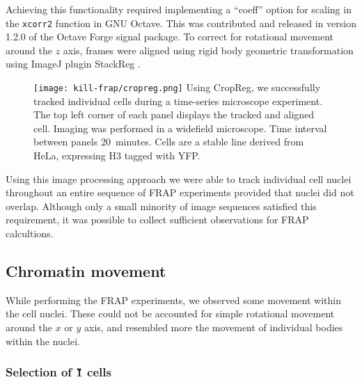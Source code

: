       Achieving this functionality required implementing a ``coeff'' option 
	  for scaling in the \texttt{xcorr2} function in GNU Octave.
	  This was contributed and released in version 1.2.0 of the Octave Forge signal package.
      To correct for rotational movement around the $z$ axis, 
      frames were aligned using rigid body geometric transformation using ImageJ plugin StackReg \citep{stackreg}.

      \begin{figure}
        \centering
        \texttt{[image: kill-frap/cropreg.png]}
          {
            Using CropReg, we successfully tracked individual cells during
            a time-series microscope experiment. The top left corner of each
            panel displays the tracked and aligned cell. Imaging was performed
            in a widefield microscope. Time interval between panels 20~minutes.
            Cells are a stable line derived from HeLa, expressing H3 tagged
            with YFP.
          }
        \label{fig:kill-frap:cropreg}
      \end{figure}

      Using this image processing approach we were able to track individual cell nuclei 
	  throughout an entire sequence of FRAP experiments  provided
      that nuclei did not overlap. 
	  Although only a small minority of image sequences satisfied this requirement, 
	  it was possible to collect sufficient observations for FRAP calcultions.

  \subsection{Chromatin movement}

    While performing the FRAP experiments, we observed some movement
    within the cell nuclei. These could not be accounted for simple rotational
    movement around the $x$ or $y$ axis, and resembled more the movement
    of individual bodies within the nuclei.

    \subsubsection{Selection of \G1{} cells}

